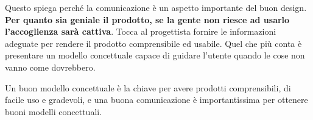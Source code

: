 Questo spiega perché la comunicazione è un aspetto importante del buon design. \textbf{ Per quanto sia geniale il prodotto, se la gente non riesce ad usarlo l'accoglienza sarà cattiva}. Tocca al progettista fornire le informazioni adeguate per rendere il prodotto comprensibile ed usabile. Quel che più conta è presentare un modello concettuale capace di guidare l'utente quando le cose non vanno come dovrebbero.

Un buon modello concettuale è la chiave per avere prodotti comprensibili, di facile uso e gradevoli, e una buona comunicazione è importantissima per ottenere buoni modelli concettuali.

\pagebreak

